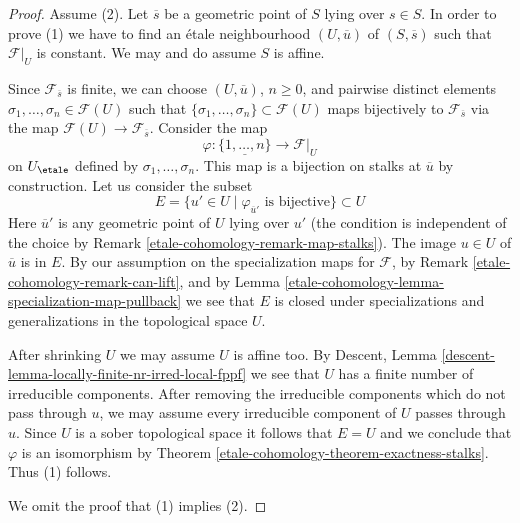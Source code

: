 \begin{proof}
Assume (2). Let $\overline{s}$ be a geometric point of $S$ lying over
$s \in S$. In order to prove (1) we have to find an \'etale neighbourhood
$(U, \overline{u})$ of $(S, \overline{s})$ such that $\mathcal{F}|_U$
is constant. We may and do assume $S$ is affine.

\medskip\noindent
Since $\mathcal{F}_{\overline{s}}$ is finite, we can choose
$(U, \overline{u})$, $n \geq 0$, and pairwise distinct elements
$\sigma_1, \ldots, \sigma_n \in \mathcal{F}(U)$
such that $\{\sigma_1, \ldots, \sigma_n\} \subset \mathcal{F}(U)$ maps
bijectively to $\mathcal{F}_{\overline{s}}$ via the map
$\mathcal{F}(U) \to \mathcal{F}_{\overline{s}}$.
Consider the map
$$
\varphi : \underline{\{1, \ldots, n\}} \longrightarrow \mathcal{F}|_U
$$
on $U_\etale$ defined by $\sigma_1, \ldots, \sigma_n$.
This map is a bijection on stalks at $\overline{u}$
by construction. Let us consider the subset
$$
E = \{u' \in U \mid \varphi_{\overline{u}'}\text{ is bijective}\} \subset U
$$
Here $\overline{u}'$ is any geometric point of $U$ lying over $u'$
(the condition is independent of the choice by Remark \ref{etale-cohomology-remark-map-stalks}).
The image $u \in U$ of $\overline{u}$ is in $E$.
By our assumption on the specialization maps for $\mathcal{F}$,
by Remark \ref{etale-cohomology-remark-can-lift}, and by
Lemma \ref{etale-cohomology-lemma-specialization-map-pullback}
we see that $E$ is closed under specializations
and generalizations in the topological space $U$.

\medskip\noindent
After shrinking $U$ we may assume $U$ is affine too. By
Descent, Lemma \ref{descent-lemma-locally-finite-nr-irred-local-fppf}
we see that $U$ has a finite number of irreducible components.
After removing the irreducible components which do not pass
through $u$, we may assume every irreducible component of $U$
passes through $u$. Since $U$ is a sober topological space
it follows that $E = U$ and we conclude that $\varphi$ is an isomorphism by
Theorem \ref{etale-cohomology-theorem-exactness-stalks}. Thus (1) follows.

\medskip\noindent
We omit the proof that (1) implies (2).
\end{proof}

